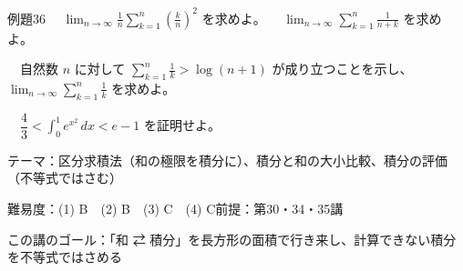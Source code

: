 \documentclass[paper=b5j, fontsize=8pt, fleqn, twoside]{jlreq}
\begin{document}
\begin{ascolorbox4A}[出典：オリジナル]{例題36}
  　$\displaystyle\lim_{n\to\infty}\frac1n\sum_{k=1}^n\left(\frac kn\right)^2$ を求めよ。\qquad
  　$\displaystyle\lim_{n\to\infty}\sum_{k=1}^n\frac1{n+k}$ を求めよ。\par
  　自然数 $n$ に対して $\displaystyle\sum_{k=1}^n\frac1k>\log(n+1)$ が成り立つことを示し、$\displaystyle\lim_{n\to\infty}\sum_{k=1}^n\frac1k$ を求めよ。\par
  　$\dfrac43<\displaystyle\int_0^1e^{x^2}\,dx<e-1$ を証明せよ。
\end{ascolorbox4A}

\begin{Data}
  テーマ：区分求積法（和の極限を積分に）、積分と和の大小比較、積分の評価（不等式ではさむ）\par
  難易度：(1) B　(2) B　(3) C　(4) C\quad 前提：第30・34・35講\par
  この講のゴール：「和 ⇄ 積分」を長方形の面積で行き来し、計算できない積分を不等式ではさめる
\end{Data}
\end{document}
